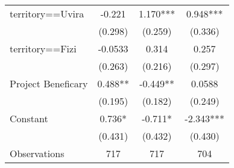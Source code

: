 {\begin{tabular}{l*{3}{c}}
territory==Uvira    &      -0.221   &       1.170***&       0.948***\\
                    &     (0.298)   &     (0.259)   &     (0.336)   \\
[1em]
territory==Fizi     &     -0.0533   &       0.314   &       0.257   \\
                    &     (0.263)   &     (0.216)   &     (0.297)   \\
[1em]
Project Beneficary  &       0.488** &      -0.449** &      0.0588   \\
                    &     (0.195)   &     (0.182)   &     (0.249)   \\
[1em]
Constant            &       0.736*  &      -0.711*  &      -2.343***\\
                    &     (0.431)   &     (0.432)   &     (0.430)   \\
\hline
Observations        &         717   &         717   &         704   \\
\hline\hline
\end{tabular}
}
